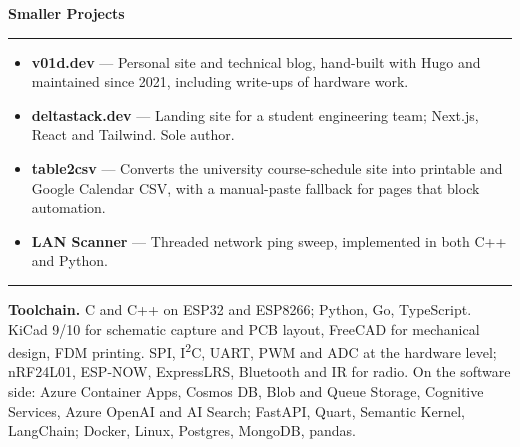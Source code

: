 \documentclass[11pt,a4paper]{article}
\newcommand{\entry}[2]{%
  \vspace{6pt}%
  {\Large\bfseries #1}\hfill{\itshape\small #2}\par
  \vspace{3pt}\hrule\vspace{4pt}%
}
\begin{document}
\entry{Smaller Projects}{}

\begin{itemize}
    \item \textbf{v01d.dev} --- Personal site and technical blog, hand-built with Hugo and maintained since 2021, including write-ups of hardware work.
    \item \textbf{deltastack.dev} --- Landing site for a student engineering team; Next.js, React and Tailwind. Sole author.
    \item \textbf{table2csv} --- Converts the university course-schedule site into printable and Google Calendar CSV, with a manual-paste fallback for pages that block automation.
    \item \textbf{LAN Scanner} --- Threaded network ping sweep, implemented in both C++ and Python.
\end{itemize}

\vspace{8pt}
\hrule
\vspace{6pt}

\textbf{Toolchain.} C and C++ on ESP32 and ESP8266; Python, Go, TypeScript.
KiCad 9/10 for schematic capture and PCB layout, FreeCAD for mechanical design,
FDM printing. SPI, I\textsuperscript{2}C, UART, PWM and ADC at the hardware
level; nRF24L01, ESP-NOW, ExpressLRS, Bluetooth and IR for radio. On the
software side: Azure Container Apps, Cosmos DB, Blob and Queue Storage,
Cognitive Services, Azure OpenAI and AI Search; FastAPI, Quart, Semantic Kernel,
LangChain; Docker, Linux, Postgres, MongoDB, pandas.
\end{document}
